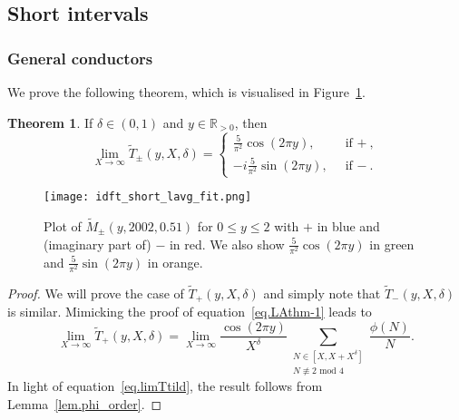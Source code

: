 \documentclass{amsart}
\theoremstyle{definition}
\newtheorem {theorem}{Theorem}[section]
\numberwithin{equation}{section}
\begin{document}
\subsection{Short intervals}
\subsubsection{General conductors}
We prove the following theorem, which is visualised in Figure~\ref{fig:idft_short_lavg}.
\begin{theorem}
If $\delta\in(0,1)$ and $y\in\mathbb{R}_{>0}$, then
\begin{equation}\label{eq.moreconductors}
\lim_{X\rightarrow\infty}\widetilde{T}_{\pm}(y,X,\delta)= \begin{cases}
\frac{5}{\pi^2}\cos(2\pi y), & \text{ if $+$},\\
-i\frac{5}{\pi^2}\sin(2\pi y), & \text{ if $-$}.
\end{cases}
\end{equation}
\end{theorem}
\begin{figure}[h]
\centering
\texttt{[image: idft\_short\_lavg\_fit.png]}
\caption{\sf Plot of $\widetilde{M}_\pm(y, 2002, 0.51)$ for $0 \leq y \leq 2$ with $+$ in blue and (imaginary part of) $-$ in red.  We also show $\frac{5}{\pi^2}\cos(2\pi y)$ in green and $\frac{5}{\pi^2}\sin(2\pi y)$ in orange.}
\label{fig:idft_short_lavg}
\end{figure}

\begin{proof}
We will prove the case of $\widetilde{T}_+(y,X,\delta)$ and simply note that $\widetilde{T}_-(y,X,\delta)$ is similar. Mimicking the proof of equation~\eqref{eq.LAthm-1} leads to 
\begin{equation}\label{eq.limTtild}
    \lim_{X \to \infty} \widetilde{T}_+(y,X,\delta) = \lim_{X \to \infty} \frac{\cos(2\pi y)}{X^\delta} \sum_{\substack{N \in [X, X+X^\delta] \\ N \not\equiv 2 \text{ mod } 4}} \frac{\phi(N)}{N}. 
\end{equation}
In light of equation~\eqref{eq.limTtild}, the result follows from Lemma~\ref{lem.phi_order}.
\end{proof}
\end{document}

